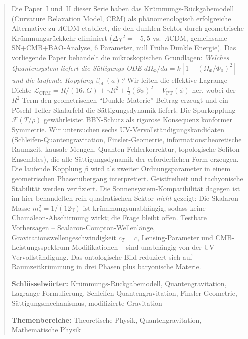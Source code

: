 \documentclass[11pt,a4paper]{article}
\begin{document}
\begin{abstract}
\noindent Die Paper~I und~II dieser Serie haben das Kr\"ummungs-R\"uckgabemodell (Curvature Relaxation Model, CRM) als ph\"anomenologisch erfolgreiche Alternative zu $\Lambda$CDM etabliert, die den dunklen Sektor durch geometrische Kr\"ummungsr\"uckkehr eliminiert ($\Delta\chi^2 = -5{,}5$ vs.\ $\Lambda$CDM, gemeinsame SN+CMB+BAO-Analyse, 6 Parameter, null Fr\"uhe Dunkle Energie). Das vorliegende Paper behandelt die mikroskopischen Grundlagen: \textit{Welches Quantensystem liefert die S\"attigungs-ODE $d\Omega_\Phi/da = k[1-(\Omega_\Phi/\Phi_0)^2]$ und die laufende Kopplung $\beta_{\mathrm{eff}}(a)$?} Wir leiten die effektive Lagrange-Dichte $\mathcal{L}_{\mathrm{CRM}} = R/(16\pi G) + \gamma R^2 + \frac{1}{2}(\partial\phi)^2 - V_{\mathrm{PT}}(\phi)$ her, wobei der $R^2$-Term den geometrischen ``Dunkle-Materie''-Beitrag erzeugt und ein P\"oschl-Teller-Skalarfeld die S\"attigungsdynamik liefert. Die Spurkopplung $\mathcal{F}(T/\rho)$ gew\"ahrleistet BBN-Schutz als rigorose Konsequenz konformer Symmetrie. Wir untersuchen sechs UV-Vervollst\"andigungskandidaten (Schleifen-Quantengravitation, Finsler-Geometrie, informationstheoretische Raumzeit, kausale Mengen, Quanten-Fehlerkorrektur, topologische Soliton-Ensembles), die alle S\"attigungsdynamik der erforderlichen Form erzeugen. Die laufende Kopplung $\beta$ wird als zweiter Ordnungsparameter in einem geometrischen Phasen\"ubergang interpretiert. Geistfreiheit und tachyonische Stabilit\"at werden verifiziert. Die Sonnensystem-Kompatibilit\"at dagegen ist im hier behandelten rein quadratischen Sektor \textit{nicht} gezeigt: Die Skalaron-Masse $m_s^2 = 1/(12\gamma)$ ist kr\"ummungsunabh\"angig, sodass keine Cham\"aleon-Abschirmung wirkt; die Frage bleibt offen. Testbare Vorhersagen -- Scalaron-Compton-Wellenl\"ange, Gravitationswellengeschwindigkeit $c_T = c$, Lensing-Parameter und CMB-Leistungsspektrum-Modifikationen -- sind unabh\"angig von der UV-Vervollst\"andigung. Das ontologische Bild reduziert sich auf Raumzeitkr\"ummung in drei Phasen plus baryonische Materie.

\vspace{0.5em}
\noindent \textbf{Schl\"usselw\"orter:} Kr\"ummungs-R\"uckgabemodell, Quantengravitation, Lagrange-Formulierung, Schleifen-Quantengravitation, Finsler-Geometrie, S\"attigungsmechanismus, modifizierte Gravitation

\vspace{0.5em}
\noindent \textbf{Themenbereiche:} Theoretische Physik, Quantengravitation, Mathematische Physik
\end{abstract}
\end{document}
